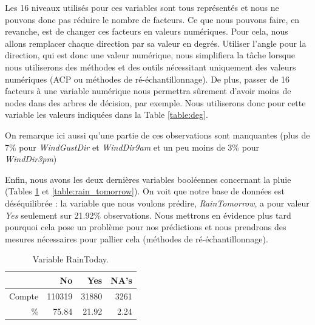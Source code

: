 \documentclass{article}
\begin{document}
Les 16 niveaux utilisés pour ces variables sont tous représentés et nous ne pouvons donc pas réduire le nombre de facteurs. Ce que nous pouvons faire, en revanche, est de changer ces facteurs en valeurs numériques. Pour cela, nous allons remplacer chaque direction par sa valeur en degrés. Utiliser l'angle pour la direction, qui est donc une valeur numérique, nous simplifiera la tâche lorsque nous utiliserons des méthodes et des outils nécessitant uniquement des valeurs numériques (ACP ou méthodes de ré-échantillonnage). De plus, passer de 16 facteurs à une variable numérique nous permettra sûrement d'avoir moins de nodes dans des arbres de décision, par exemple. Nous utiliserons donc pour cette variable les valeurs indiquées dans la Table \ref{table:deg}.

\begin{table}[htp]
    \centering
    \caption{Les 16 points cardinaux en degrés.}
    \label{table:deg}
\end{table}

On remarque ici aussi qu'une partie de ces observations sont manquantes (plus de 7\% pour \emph{WindGustDir} et \emph{WindDir9am} et un peu moins de 3\% pour \emph{WindDir3pm})

Enfin, nous avons les deux dernières variables booléennes concernant la pluie (Tables \ref{table:rain_today} et \ref{table:rain_tomorrow}). On voit que notre base de données est déséquilibrée : la variable que nous voulons prédire, \emph{RainTomorrow}, a pour valeur \emph{Yes} seulement sur 21.92\% observations. Nous mettrons en évidence plus tard pourquoi cela pose un problème pour nos prédictions et nous prendrons des mesures nécessaires pour pallier cela (méthodes de ré-échantillonnage).  

\begin{table}[htp]
    \centering
    \begin{tabular}{|r||rrr|}
        \hline
        &    No &    Yes &   NA's \\
        \hline
        \hline
        Compte & 110319 &  31880 &   3261 \\
        \% & 75.84 & 21.92 & 2.24 \\
        \hline
    \end{tabular}
    \caption{Variable RainToday.}
    \label{table:rain_today}
\end{table}
\end{document}
